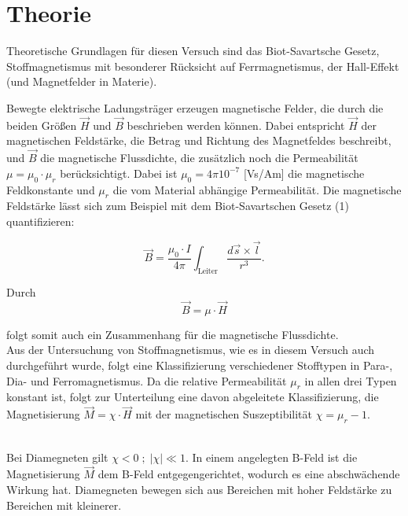 \usepackage{unicode-math}\usepackage{siunitx}

\section{Theorie}
\label{sec:Theorie}
Theoretische Grundlagen für diesen Versuch sind das Biot-Savartsche Gesetz, Stoffmagnetismus mit besonderer Rücksicht auf Ferrmagnetismus,
der Hall-Effekt (und Magnetfelder in Materie).

Bewegte elektrische Ladungsträger erzeugen magnetische Felder, die durch die beiden Größen $\vec H$ und $\vec B$ beschrieben werden können.
Dabei entspricht $\vec H$ der magnetischen Feldstärke, die Betrag und Richtung des Magnetfeldes beschreibt, und $\vec B$ die magnetische Flussdichte,
die zusätzlich noch die Permeabilität $ \mu=\mu_0 \cdot\mu_r $ berücksichtigt. Dabei ist $ \mu_0=4\pi 10^{-7} $ [Vs/Am]
die magnetische Feldkonstante und $ \mu_r $ die vom Material abhängige Permeabilität. 
Die magnetische Feldstärke lässt sich zum Beispiel mit dem Biot-Savartschen Gesetz (1) quantifizieren:

\begin{equation}
    \vec B = \frac{\mu_0\cdot I}{4\pi}\int_{\text{Leiter}}\frac{d\vec s\times\vec l}{r^3}.
    \label{eqn:biotsavart}
\end{equation}



Durch 
\begin{equation}
    \vec B=\mu\cdot\vec H
\end{equation} 


folgt somit auch ein Zusammenhang für die magnetische Flussdichte.
\\
Aus der Untersuchung von Stoffmagnetismus, wie es in diesem Versuch auch durchgeführt wurde, folgt eine
Klassifizierung verschiedener Stofftypen in Para-, Dia- und Ferromagnetismus. Da die relative Permeabilität $\mu_r$ in allen drei Typen konstant ist,
folgt zur Unterteilung eine davon abgeleitete Klassifizierung, die Magnetisierung $\vec M=\chi\cdot\vec H$ mit der magnetischen Suszeptibilität
$\chi=\mu_r -1$.

\\
Bei Diamegneten gilt $\chi <0\; ; \;|\chi|\ll 1$. In einem angelegten B-Feld ist die Magnetisierung $\vec M$ dem B-Feld entgegengerichtet, wodurch es
eine abschwächende Wirkung hat. Diamegneten bewegen sich aus Bereichen mit hoher Feldstärke zu Bereichen mit kleinerer.

